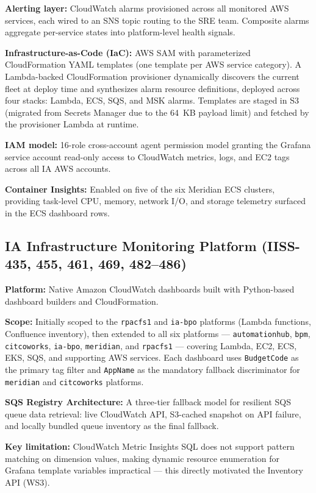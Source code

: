 \textbf{Alerting layer:} CloudWatch alarms provisioned across all
monitored AWS services, each wired to an SNS topic routing to the SRE
team. Composite alarms aggregate per-service states into platform-level
health signals.

\textbf{Infrastructure-as-Code (IaC):} AWS SAM with parameterized
CloudFormation YAML templates (one template per AWS service category).
A Lambda-backed CloudFormation provisioner dynamically discovers the
current fleet at deploy time and synthesizes alarm resource definitions,
deployed across four stacks: Lambda, ECS, SQS, and MSK alarms.
Templates are staged in S3 (migrated from Secrets Manager due to the
64~KB payload limit) and fetched by the provisioner Lambda at runtime.

\textbf{IAM model:} 16-role cross-account agent permission model granting
the Grafana service account read-only access to CloudWatch metrics, logs,
and EC2 tags across all IA AWS accounts.

\textbf{Container Insights:} Enabled on five of the six Meridian ECS
clusters, providing task-level CPU, memory, network I/O, and storage
telemetry surfaced in the ECS dashboard rows.

\subsection{IA Infrastructure Monitoring Platform (IISS-435, 455, 461, 469, 482--486)}

\textbf{Platform:} Native Amazon CloudWatch dashboards built with
Python-based dashboard builders and CloudFormation.

\textbf{Scope:} Initially scoped to the \texttt{rpacfs1} and
\texttt{ia-bpo} platforms (Lambda functions, Confluence inventory),
then extended to all six platforms --- \texttt{automationhub},
\texttt{bpm}, \texttt{citcoworks}, \texttt{ia-bpo}, \texttt{meridian}, and
\texttt{rpacfs1} --- covering Lambda, EC2, ECS, EKS, SQS, and
supporting AWS services. Each dashboard uses \texttt{BudgetCode} as
the primary tag filter and \texttt{AppName} as the mandatory fallback
discriminator for \texttt{meridian} and \texttt{citcoworks} platforms.

\textbf{SQS Registry Architecture:} A three-tier fallback model for
resilient SQS queue data retrieval: live CloudWatch API, S3-cached
snapshot on API failure, and locally bundled queue inventory as the
final fallback.

\textbf{Key limitation:} CloudWatch Metric Insights SQL does not support
pattern matching on dimension values, making dynamic resource enumeration
for Grafana template variables impractical --- this directly motivated the
Inventory API (WS3).

